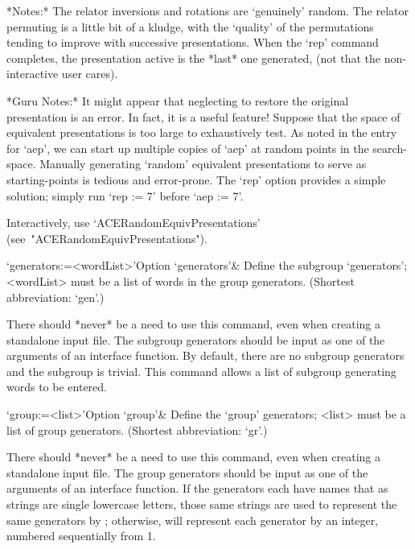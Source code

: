 *Notes:*
The relator inversions and rotations are \lq{}genuinely'  random.  The
relator permuting is a little bit of a kludge, with the  \lq{}quality'
of the permutations tending to improve with successive  presentations.
When the `rep' command  completes,  the  presentation  active  is  the
*last* one generated, (not that the non-interactive user cares).

*Guru Notes:*
It might appear that neglecting to restore the  original  presentation
is an error. In fact, it is a useful feature! Suppose that  the  space
of equivalent presentations is too  large  to  exhaustively  test.  As
noted in the entry for `aep', we can start up multiple copies of `aep'
at random points in the  search-space.  Manually  generating  `random'
equivalent presentations to serve as starting-points  is  tedious  and
error-prone. The `rep' option provides a simple solution;  simply  run
`rep := 7' before `aep := 7'.

Interactively,            use            `ACERandomEquivPresentations'
(see~"ACERandomEquivPresentations").

\enditems


\beginitems

\>`generators:=<wordList>'{Option `generators'}&
Define the subgroup `generators'; <wordList> must be a list  of  words
in the group generators.
(Shortest abbreviation: `gen'.)

There should *never* be a need to use this command, even when creating
a standalone input file. The subgroup generators should  be  input  as
one of the arguments of an  {\ACE}  interface  function.  By  default,
there are no subgroup generators and the  subgroup  is  trivial.  This
command allows a list of subgroup generating words to be entered.

\>`group:=<list>'{Option `group'}&
Define the `group' generators; <list> must be a list of  {\GAP}  group
generators.
(Shortest abbreviation: `gr'.)

There should *never* be a need to use this command, even when creating
a standalone input file. The group generators should be input  as  one
of the arguments of an {\ACE} interface function.  If  the  generators
each have names that as strings are single  lowercase  letters,  those
same strings are used to represent  the  same  generators  by  {\ACE};
otherwise,  {\ACE}  will  represent  each  generator  by  an  integer,
numbered sequentially from 1.

